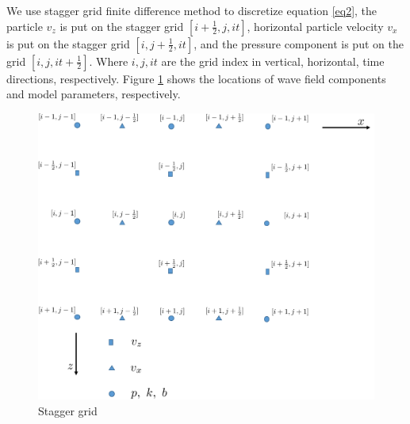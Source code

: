 \documentclass[revised,endfloat]{geophysics}
\begin{document}
We use stagger grid finite difference method to discretize equation \ref{eq2}, the particle $v_z$ is put on the stagger grid $[i+\frac{1}{2},j,it]$, horizontal particle velocity $v_x$ is put on the stagger grid $[i, j+\frac{1}{2}, it]$, and the pressure component is put on the grid $[i,j,it+\frac{1}{2}]$. Where $i,j,it$ are the grid index in vertical, horizontal, time directions, respectively. Figure \ref{f1} shows the locations of wave field components and model parameters, respectively.
\begin{figure}[htb] 
   \centering
   \includegraphics[width=0.6\columnwidth]{Fig/f1.pdf} 
   \caption{Stagger grid}
   \label{f1}
\end{figure}
\end{document}
